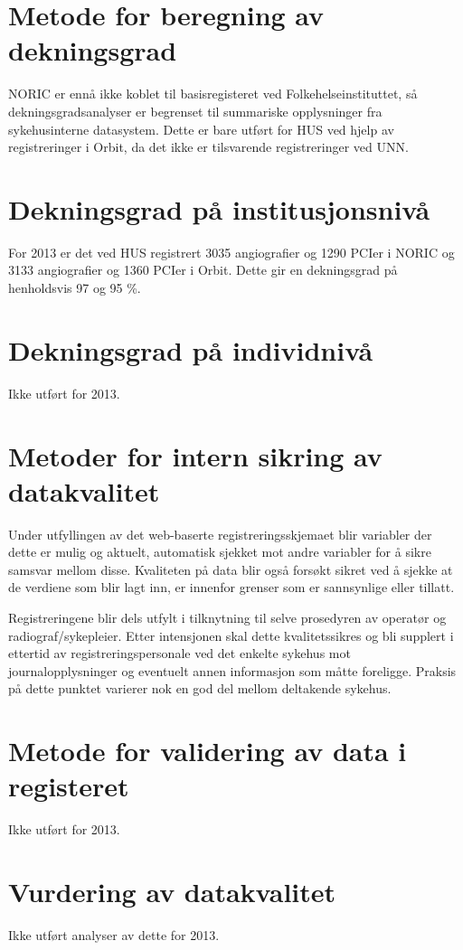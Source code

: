 \documentclass[norsk, a4paper]{report}
\begin{document}
\section{Metode for beregning av dekningsgrad}\label{sec:met}
NORIC er ennå ikke koblet til basisregisteret ved Folkehelseinstituttet, så dekningsgradsanalyser er begrenset til summariske opplysninger fra sykehusinterne datasystem. Dette er bare utført for HUS ved hjelp av registreringer i Orbit, da det ikke er tilsvarende registreringer ved UNN. 

\section{Dekningsgrad på institusjonsnivå}\label{sec:endek}
For 2013 er det ved HUS registrert 3035 angiografier og 1290 PCIer i NORIC og 3133 angiografier og 1360 PCIer  i Orbit. Dette gir en dekningsgrad på henholdsvis 97 og 95 \%.

\section{Dekningsgrad på individnivå}\label{sec:obs}
Ikke utført for 2013.

\section{Metoder for intern sikring av datakvalitet}\label{sec:sik}
Under utfyllingen av det web-baserte registreringsskjemaet blir variabler der dette er mulig og aktuelt, automatisk sjekket mot andre variabler for å sikre samsvar mellom disse. Kvaliteten på data blir også forsøkt sikret ved å sjekke at de verdiene som blir lagt inn, er innenfor grenser som er sannsynlige eller tillatt. 

Registreringene blir dels utfylt i tilknytning til selve prosedyren av operatør og radiograf/sykepleier. Etter intensjonen skal dette kvalitetssikres og bli supplert i ettertid av registreringspersonale ved det enkelte sykehus mot journalopplysninger og eventuelt annen informasjon som måtte foreligge. Praksis på dette punktet varierer nok en god del mellom deltakende sykehus.

\section{Metode for validering av data i registeret}\label{sec:metval}
Ikke utført for 2013.

\section{Vurdering av datakvalitet}\label{sec:valdat}
Ikke utført analyser av dette for 2013.
\end{document}
